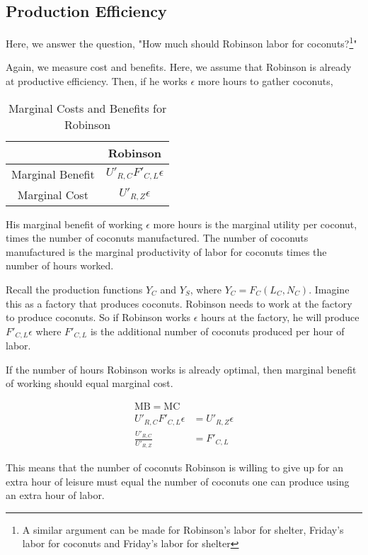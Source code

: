 \documentclass[11pt]{scrartcl}
\begin{document}
\subsection{Production Efficiency}

Here, we answer the question, "How much should Robinson labor for coconuts?\footnote{A similar argument can be made for Robinson's labor for shelter, Friday's labor for coconuts and Friday's labor for shelter}"

Again, we measure cost and benefits. Here, we assume that Robinson is already at productive efficiency. Then, if he works $\epsilon$ more hours to gather coconuts,

\begin{table}[ht!]
\begin{longtable}{c|c}
\hline
 & Robinson \\
\hline
Marginal Benefit & $U'_{R,C} F'_{C,L} \epsilon$ \\
Marginal Cost & $U'_{R,Z} \epsilon$ \\
\hline
\end{longtable}
\caption{Marginal Costs and Benefits for Robinson}
\end{table}

His marginal benefit of working $\epsilon$ more hours is the marginal utility per coconut, times the number of coconuts manufactured. The number of coconuts manufactured is the marginal productivity of labor for coconuts times the number of hours worked. 

Recall the production functions $Y_C$ and $Y_S$, where $Y_C = F_C(L_C, N_C)$. Imagine this as a factory that produces coconuts. Robinson needs to work at the factory to produce coconuts. So if Robinson works $\epsilon$ hours at the factory, he will produce $F'_{C,L} \epsilon$ where $F'_{C,L}$ is the additional number of coconuts produced per hour of labor. 

If the number of hours Robinson works is already optimal, then marginal benefit of working should equal marginal cost.

\begin{align*}
\mathrm{MB} = \mathrm{MC}\\
U'_{R,C} F'_{C,L} \epsilon &= U'_{R,Z} \epsilon \\
\frac{U'_{R,C}}{U'_{R,Z}} &= F'_{C,L}
\end{align*}

This means that the number of coconuts Robinson is willing to give up for an extra hour of leisure must equal the number of coconuts one can produce using an extra hour of labor. 
\end{document}
